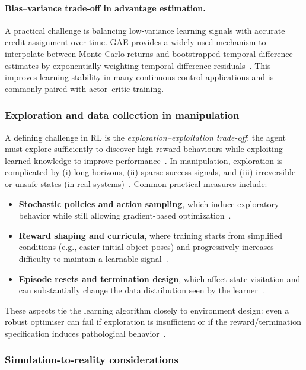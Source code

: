 \paragraph{Bias--variance trade-off in advantage estimation.}
A practical challenge is balancing low-variance learning signals with accurate credit assignment over time.
\ac{GAE} provides a widely used mechanism to interpolate between Monte Carlo returns
and bootstrapped temporal-difference estimates by exponentially weighting temporal-difference residuals~\cite{Schulman2015GAE}.
This improves learning stability in many continuous-control applications and is commonly paired with actor--critic training.

\subsubsection{Exploration and data collection in manipulation}
\label{sec:rl_exploration}

A defining challenge in \ac{RL} is the \emph{exploration--exploitation trade-off}: the agent must explore sufficiently to
discover high-reward behaviours while exploiting learned knowledge to improve performance~\cite{SuttonBarto2018}.
In manipulation, exploration is complicated by (i) long horizons, (ii) sparse success signals, and (iii) irreversible or
unsafe states (in real systems)~\cite{Kober2013Survey}. Common practical measures include:
\begin{itemize}
  \item \textbf{Stochastic policies and action sampling}, which induce exploratory behavior while still allowing
  gradient-based optimization~\cite{SuttonBarto2018}.
  \item \textbf{Reward shaping and curricula}, where training starts from simplified conditions (e.g., easier initial
  object poses) and progressively increases difficulty to maintain a learnable signal~\cite{Kober2013Survey}.
  \item \textbf{Episode resets and termination design}, which affect state visitation and can substantially change the
  data distribution seen by the learner~\cite{Kober2013Survey}.
\end{itemize}
These aspects tie the learning algorithm closely to environment design: even a robust optimiser can fail if exploration
is insufficient or if the reward/termination specification induces pathological behavior~\cite{Kober2013Survey,SuttonBarto2018}.

\subsubsection{Simulation-to-reality considerations}
\label{sec:rl_sim2real}

